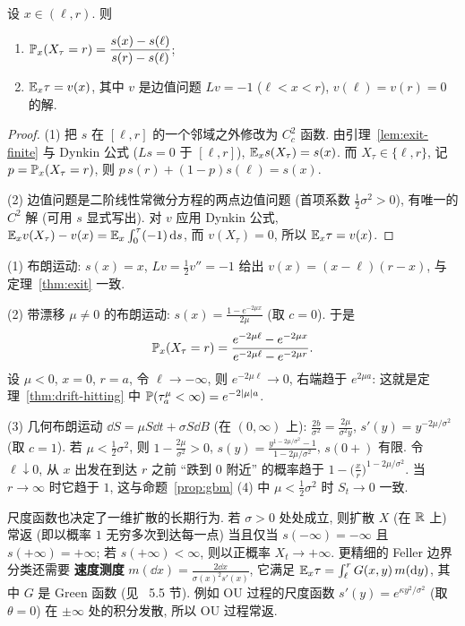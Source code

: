 \begin{theorem}[一维扩散的出口问题]\label{thm:exit-diffusion}
设 $x\in(\ell,r)$. 则
\begin{enumerate}
\item $\P_x(X_\tau=r)=\dfrac{s(x)-s(\ell)}{s(r)-s(\ell)}$;
\item $\E_x\tau=v(x)$, 其中 $v$ 是边值问题 $Lv=-1$ ($\ell<x<r$), $v(\ell)=v(r)=0$ 的解.
\end{enumerate}
\end{theorem}

\begin{proof}
(1) 把 $s$ 在 $[\ell,r]$ 的一个邻域之外修改为 $C^2_c$ 函数. 由引理~\ref{lem:exit-finite} 与 Dynkin 公式 ($Ls=0$ 于 $[\ell,r]$), $\E_xs(X_\tau)=s(x)$. 而 $X_\tau\in\{\ell,r\}$, 记 $p=\P_x(X_\tau=r)$, 则 $p\,s(r)+(1-p)s(\ell)=s(x)$.

(2) 边值问题是二阶线性常微分方程的两点边值问题 (首项系数 $\frac{1}{2}\sigma^2>0$), 有唯一的 $C^2$ 解 (可用 $s$ 显式写出). 对 $v$ 应用 Dynkin 公式, $\E_xv(X_\tau)-v(x)=\E_x\int_0^\tau(-1)\dd s$, 而 $v(X_\tau)=0$, 所以 $\E_x\tau=v(x)$.
\end{proof}

\begin{example}\label{ex:exit-examples}
(1) 布朗运动: $s(x)=x$, $Lv=\frac{1}{2}v''=-1$ 给出 $v(x)=(x-\ell)(r-x)$, 与定理~\ref{thm:exit} 一致.

(2) 带漂移 $\mu\neq0$ 的布朗运动: $s(x)=\frac{1-e^{-2\mu x}}{2\mu}$ (取 $c=0$). 于是
\[
\P_x(X_\tau=r)=\frac{e^{-2\mu\ell}-e^{-2\mu x}}{e^{-2\mu\ell}-e^{-2\mu r}}.
\]
设 $\mu<0$, $x=0$, $r=a$, 令 $\ell\to-\infty$, 则 $e^{-2\mu\ell}\to0$, 右端趋于 $e^{2\mu a}$: 这就是定理~\ref{thm:drift-hitting} 中 $\P(\tau^\mu_a<\infty)=e^{-2\abs{\mu}a}$.

(3) 几何布朗运动 $\dd S=\mu S\dd t+\sigma S\dd B$ (在 $(0,\infty)$ 上): $\frac{2b}{\sigma^2}=\frac{2\mu}{\sigma^2y}$, $s'(y)=y^{-2\mu/\sigma^2}$ (取 $c=1$). 若 $\mu<\frac{1}{2}\sigma^2$, 则 $1-\frac{2\mu}{\sigma^2}>0$, $s(y)=\frac{y^{1-2\mu/\sigma^2}-1}{1-2\mu/\sigma^2}$, $s(0+)$ 有限. 令 $\ell\downarrow0$, 从 $x$ 出发在到达 $r$ 之前 ``跌到 $0$ 附近'' 的概率趋于 $1-\big(\frac{x}{r}\big)^{1-2\mu/\sigma^2}$. 当 $r\to\infty$ 时它趋于 $1$, 这与命题~\ref{prop:gbm} (4) 中 $\mu<\frac{1}{2}\sigma^2$ 时 $S_t\to0$ 一致.
\end{example}

\begin{remark}[边界分类与常返性]
尺度函数也决定了一维扩散的长期行为. 若 $\sigma>0$ 处处成立, 则扩散 $X$ (在 $\R$ 上) 常返 (即以概率 $1$ 无穷多次到达每一点) 当且仅当 $s(-\infty)=-\infty$ 且 $s(+\infty)=+\infty$; 若 $s(+\infty)<\infty$, 则以正概率 $X_t\to+\infty$. 更精细的 Feller 边界分类还需要 \textbf{速度测度} $m(\dd x)=\frac{2\dd x}{\sigma(x)^2s'(x)}$, 它满足 $\E_x\tau=\int_\ell^rG(x,y)\,m(\dd y)$, 其中 $G$ 是 Green 函数 (见~\cite{karatzas} 5.5 节). 例如 OU 过程的尺度函数 $s'(y)=e^{\kappa y^2/\sigma^2}$ (取 $\theta=0$) 在 $\pm\infty$ 处的积分发散, 所以 OU 过程常返.
\end{remark}

